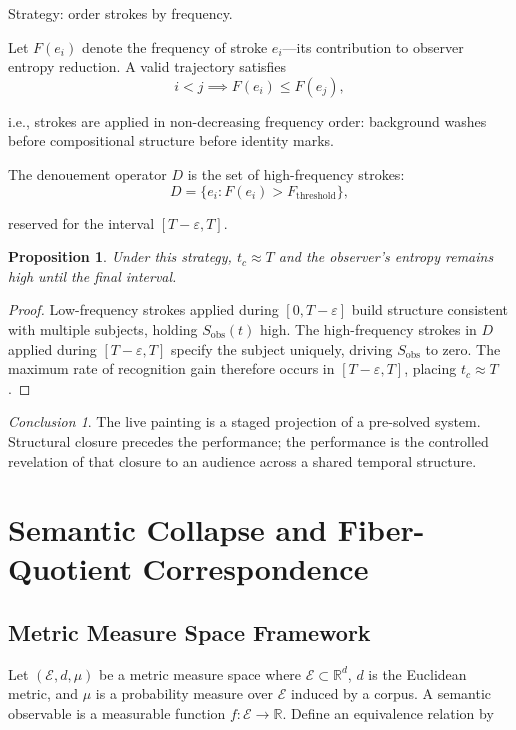 \documentclass[11pt, twoside]{article}
\theoremstyle{plain}
\newtheorem{proposition}[theorem]{Proposition}
\theoremstyle{definition}
\theoremstyle{remark}
\newtheorem{conclusion}[theorem]{Conclusion}
\begin{document}
Strategy: order strokes by frequency.

Let $F(e_i)$ denote the frequency of stroke $e_i$---its contribution to observer entropy reduction. A valid trajectory satisfies
\[
i < j \implies F(e_i) \leq F(e_j),
\]

i.e., strokes are applied in non-decreasing frequency order: background washes before compositional structure before identity marks.

The denouement operator $D$ is the set of high-frequency strokes:
\[
D = \{ e_i : F(e_i) > F_{\text{threshold}} \},
\]

reserved for the interval $[T - \varepsilon, T]$.

\begin{proposition}
Under this strategy, $t_c \approx T$ and the observer's entropy remains high until the final interval.
\end{proposition}

\begin{proof}
Low-frequency strokes applied during $[0, T - \varepsilon]$ build structure consistent with multiple subjects, holding $S_{\text{obs}}(t)$ high. The high-frequency strokes in $D$ applied during $[T - \varepsilon, T]$ specify the subject uniquely, driving $S_{\text{obs}}$ to zero. The maximum rate of recognition gain therefore occurs in $[T - \varepsilon, T]$, placing $t_c \approx T$.
\end{proof}

\begin{conclusion}
The live painting is a staged projection of a pre-solved system. Structural closure precedes the performance; the performance is the controlled revelation of that closure to an audience across a shared temporal structure.
\end{conclusion}

\section{Semantic Collapse and Fiber-Quotient Correspondence}
\label{app:collapse_formal}

\subsection{Metric Measure Space Framework}

Let $(\mathcal{E}, d, \mu)$ be a metric measure space where $\mathcal{E} \subset \mathbb{R}^d$, $d$ is the Euclidean metric, and $\mu$ is a probability measure over $\mathcal{E}$ induced by a corpus. A semantic observable is a measurable function $f : \mathcal{E} \to \mathbb{R}$. Define an equivalence relation by
\end{document}
